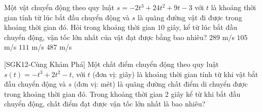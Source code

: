 \begin{ex}%
	Một vật chuyển động theo quy luật $s = -2t^3 + 24t^2 + 9t - 3$ với $t$ là khoảng thời gian tính từ lúc bắt đầu chuyển động và $s$ là quãng đường vật đi được trong khoảng thời gian đó. Hỏi trong khoảng thời gian $10$ giây, kể  từ lúc bắt đầu chuyển động, vận tốc lớn nhất của vật đạt được bằng bao nhiêu?
	 \choice
		{$289$ m/s} 
		 {\True $105$ m/s}
		 {$111$ m/s}
		{$487$ m/s} 
\end{ex}

\begin{bt}%
 [SGK12-Cùng Khám Phá]
	Một chất điểm chuyển động theo quy luật $s(t)=-t^3+2t^2-t$, với $t$ (đơn vị: giây) là khoảng thời gian tính từ khi vật bắt đầu chuyển động và $s$ (đơn vị: mét) là quãng đường chất điểm di chuyển được trong khoảng thời gian đó. Trong khoảng thời gian 2 giây kể từ khi bắt đầu chuyển động, chất điểm đạt được vận tốc lớn nhất là bao nhiêu?
\end{bt}

